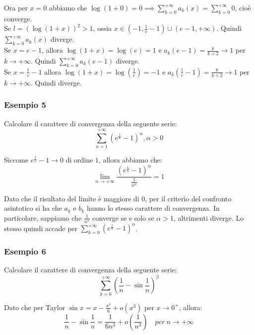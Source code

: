 \documentclass{article}
\begin{document}
\noindent Ora per $x = 0$ abbiamo che $\log(1 + 0) = 0 \implies \sum_{k = 0}^{+\infty} a_k(x) = \sum_{k = 0}^{+\infty} 0$, cioè converge.\\
Se $l = (\log(1 + x))^2 > 1$, ossia $x \in (-1, \frac{1}{e} - 1) \cup (e - 1, +\infty)$. Quindi $\sum_{k = 0}^{+\infty} a_k(x)$ diverge.\\
Se $x = e - 1$, allora $\log(1 + x) = \log(e) = 1$ e $a_k(e - 1) = \frac{k}{k + 2} \to 1$ per $k \to +\infty$. Quindi $\sum_{k = 0}^{+\infty} a_k(e - 1)$ diverge.\\
Se $x = \frac{1}{e} - 1$ allora $\log(1 + x) = \log(\frac{1}{e}) = -1$ e $a_k(\frac{1}{e} - 1) = \frac{k}{k + 2} \to 1$ per $k \to +\infty$. Quindi diverge.

\subsubsection{Esempio 5}
Calcolare il carattere di convergenza della seguente serie:
\begin{equation*}
    \sum_{n = 1}^{+\infty} (e^{\frac{1}{n}} - 1)^\alpha, \alpha > 0
\end{equation*}

\noindent Siccome $e^{\frac{1}{n}} - 1 \to 0$ di ordine $1$, allora abbiamo che:
\begin{equation*}
    \lim_{n \to +\infty} \frac{(e^{\frac{1}{n}} - 1)^\alpha}{\frac{1}{n^\alpha}} = 1
\end{equation*}

\noindent Dato che il risultato del limite è maggiore di $0$, per il criterio del confronto asintotico si ha che $a_k$ e $b_k$ hanno lo stesso carattere di convergenza. In particolare, sappiamo che $\frac{1}{n^\alpha}$ converge se e solo se $\alpha > 1$, altrimenti diverge. Lo stesso quindi accade per $\sum_{k = 0}^{+\infty} (e^{\frac{1}{n}} - 1)^\alpha$.

\subsubsection{Esempio 6}
Calcolare il carattere di convergenza della seguente serie:
\begin{equation*}
    \sum_{k = 0}^{+\infty} \left(\frac{1}{n} - \sin\frac{1}{n}\right)^\beta
\end{equation*}

\noindent Dato che per Taylor $\sin x = x - \frac{x^3}{6} + o(x^3)$ per $x \to 0^+$, allora:
\begin{equation*}
    \frac{1}{n} - \sin\frac{1}{n} = \frac{1}{6n^3} + o\left(\frac{1}{n^3}\right) \quad per \ n \to +\infty
\end{equation*}
\end{document}
